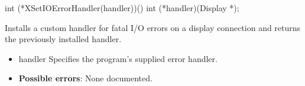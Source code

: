 \documentclass{report}
\begin{document}
\begin{itemize}
        \begin{cppcode}
            int (*XSetIOErrorHandler(handler))()
                int (*handler)(Display *);
        \end{cppcode}
        \bigbreak \noindent
        Installs a custom handler for fatal I/O errors on a display connection and returns the previously installed handler.
        \begin{itemize}
            \item handler Specifies the program’s supplied error handler.
        \end{itemize}
        \begin{itemize}
            \item \textbf{Possible errors}: None documented.
        \end{itemize}



    \end{itemize}
\end{document}
